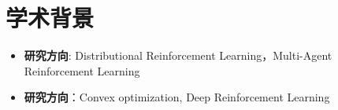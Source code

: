 \documentclass{resume}
\begin{document}






\section{学术背景}



\begin{itemize}[parsep=1ex]
  \item \textbf{研究方向}: Distributional Reinforcement Learning，Multi-Agent Reinforcement Learning
\end{itemize}

\begin{itemize} [parsep=1ex]
  \item \textbf{研究方向}：Convex optimization, Deep Reinforcement Learning
\end{itemize}
\end{document}
